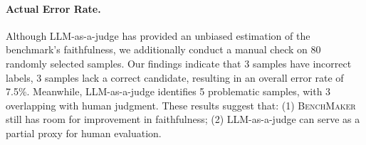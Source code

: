 \paragraph{Actual Error Rate.}
Although LLM-as-a-judge has provided an unbiased estimation of the benchmark’s faithfulness, we additionally conduct a manual check on 80 randomly selected samples. Our findings indicate that 3 samples have incorrect labels, 3 samples lack a correct candidate, resulting in an overall error rate of 7.5\%. Meanwhile, LLM-as-a-judge identifies 5 problematic samples, with 3 overlapping with human judgment. These results suggest that: (1) \textsc{BenchMaker} still has room for improvement in faithfulness; (2) LLM-as-a-judge can serve as a partial proxy for human evaluation.
